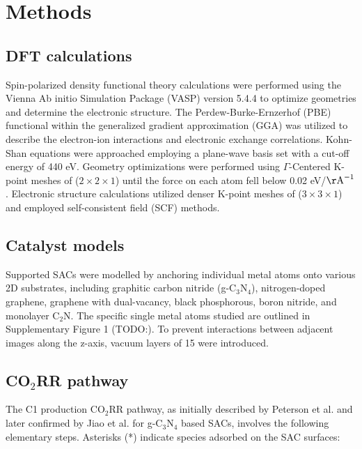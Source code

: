 

\section{Methods}


\subsection{DFT calculations}
Spin-polarized density functional theory calculations were performed using the Vienna Ab initio Simulation Package (VASP) version 5.4.4 \cite{kresse1996efficient, kresse1996efficiency, kresse1993ab} to optimize geometries and determine the electronic structure.
The Perdew-Burke-Ernzerhof (PBE) functional \cite{kresse1996efficient} within the generalized gradient approximation (GGA) \cite{perdew1996generalized} was utilized to describe the electron-ion interactions and electronic exchange correlations.
Kohn-Shan equations were approached employing a plane-wave basis set with a cut-off energy of 440 eV.
Geometry optimizations were performed using $\Gamma$-Centered K-point meshes of ($2\times2\times1$) until the force on each atom fell below 0.02 eV/\(\mathrm{\AA}^{-1}\).
Electronic structure calculations utilized denser K-point meshes of ($3\times3\times1$) and employed self-consistent field (SCF) methods.


\subsection{Catalyst models}
Supported SACs were modelled by anchoring individual metal atoms onto various 2D substrates, including graphitic carbon nitride (g-C$_3$N$_4$), nitrogen-doped graphene, graphene with dual-vacancy, black phosphorous, boron nitride, and monolayer C$_2$N.
The specific single metal atoms studied are outlined in Supplementary Figure 1 (TODO:).
To prevent interactions between adjacent images along the z-axis, vacuum layers of 15 \text{\AA} were introduced.


\subsection{CO$_2$RR pathway}
The C1 production CO$_2$RR pathway, as initially described by Peterson et al. \cite{peterson2010copper} and later confirmed by Jiao et al. \cite{jiao2017molecular} for g-C$_3$N$_4$ based SACs, involves the following elementary steps.
Asterisks (*) indicate species adsorbed on the SAC surfaces:

